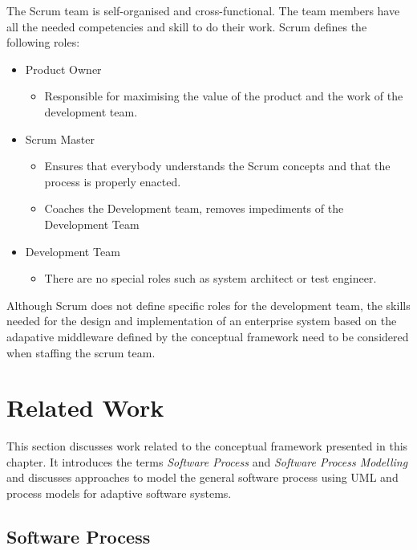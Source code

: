 The Scrum team is self-organised and cross-functional. The team members have all the needed competencies and skill to do their work.
Scrum defines the following roles:
\begin{itemize}
	\item Product Owner
	\begin{itemize}
		\item Responsible for maximising the value of the product and the work of the development team.
	\end{itemize}
	\item Scrum Master
	\begin{itemize}
		\item Ensures that everybody understands the Scrum concepts and that the process is properly enacted.
		\item Coaches the Development team, removes impediments of the Development Team
	\end{itemize}
	\item Development Team
	\begin{itemize}
		\item There are no special roles such as system architect or test engineer.
	\end{itemize}
\end{itemize}

Although Scrum does not define specific roles for the development team, the skills needed for the design and implementation of an enterprise system based on the adapative middleware defined by the conceptual framework need to be considered when staffing the scrum team. 


\section{Related Work}
\label{sec:ch6_related_work}

This section discusses work related to the conceptual framework presented in this chapter. It introduces the terms \emph{Software Process} and \emph{Software Process Modelling} and discusses approaches to model the general software process using \ac{UML} and process models for adaptive software systems.

\subsection{Software Process}


